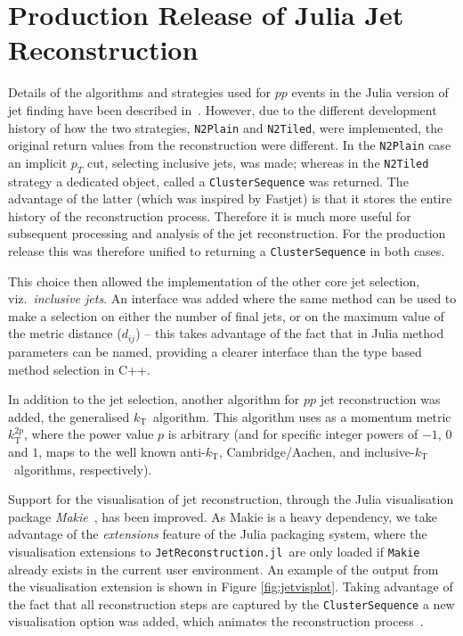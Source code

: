 \documentclass{webofc}
\newcommand{\kt}{${k}_\text{T}$}
\newcommand{\akt}{anti-${k}_\text{T}$}
\newcommand{\JR}{\texttt{JetReconstruction.jl}}
\begin{document}
\section{Production Release of Julia Jet Reconstruction}
\label{sec:prodrel}

Details of the algorithms and strategies used for $pp$ events in the Julia
version of jet finding have been described in~\cite{polyglot-jets-chep23}.
However, due to the different development history of how the two strategies,
\texttt{N2Plain} and \texttt{N2Tiled}, were implemented, the original return
values from the reconstruction were different. In the \texttt{N2Plain} case an
implicit $p_T$ cut, selecting inclusive jets, was made; whereas in the
\texttt{N2Tiled} strategy a dedicated object, called a \texttt{ClusterSequence}
was returned. The advantage of the latter (which was inspired by Fastjet) is
that it stores the entire history of the reconstruction process. Therefore it is
much more useful for subsequent processing and analysis of the jet
reconstruction. For the production release this was therefore unified to
returning a \texttt{ClusterSequence} in both cases.

This choice then allowed the implementation of the other core jet selection,
viz.\ \emph{inclusive jets}. An interface was added where the same method can be
used to make a selection on either the number of final jets, or on the maximum
value of the metric distance ($d_{ij}$) -- this takes advantage of the fact that
in Julia method parameters can be named, providing a clearer interface than the
type based method selection in C++.

In addition to the jet selection, another algorithm for $pp$ jet reconstruction
was added, the generalised \kt\ algorithm. This algorithm uses as a momentum
metric $k^{2p}_\text{T}$, where the power value $p$ is arbitrary (and for
specific integer powers of $-1$, $0$ and $1$, maps to the well known \akt,
Cambridge/Aachen, and inclusive-\kt\ algorithms, respectively).

Support for the visualisation of jet reconstruction, through the Julia
visualisation package \emph{Makie}~\cite{Danisch2021}, has been improved. As
Makie is a heavy dependency, we take advantage of the \emph{extensions} feature
of the Julia packaging system, where the visualisation extensions to \JR\ are
only loaded if \texttt{Makie} already exists in the current user environment. An
example of the output from the visualisation extension is shown in Figure
\ref{fig:jetvisplot}. Taking advantage of the fact that all reconstruction steps
are captured by the \texttt{ClusterSequence} a new visualisation option was
added, which animates the reconstruction
process~\cite{jetrecoAnimationCHEP2024}.
\end{document}

